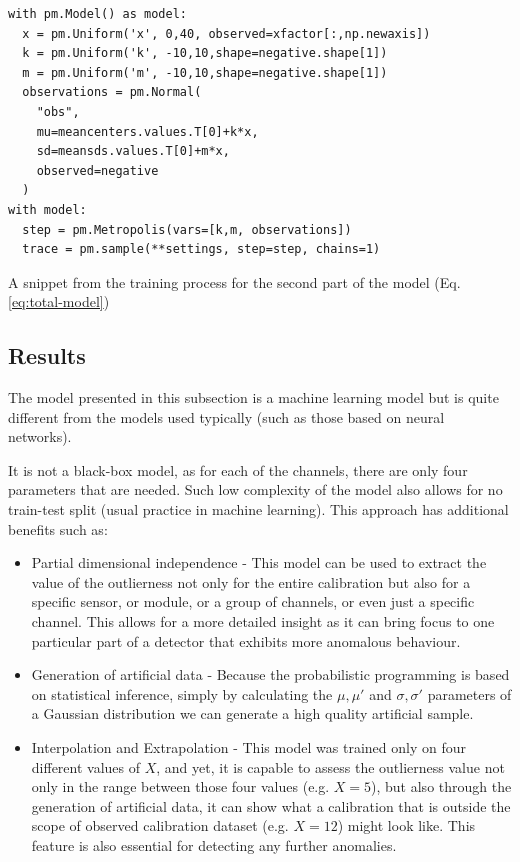 \begin{listing}[!ht]
\begin{verbatim}
with pm.Model() as model:
  x = pm.Uniform('x', 0,40, observed=xfactor[:,np.newaxis])
  k = pm.Uniform('k', -10,10,shape=negative.shape[1])
  m = pm.Uniform('m', -10,10,shape=negative.shape[1])
  observations = pm.Normal(
    "obs",
    mu=meancenters.values.T[0]+k*x,
    sd=meansds.values.T[0]+m*x,
    observed=negative
  )
with model:
  step = pm.Metropolis(vars=[k,m, observations])
  trace = pm.sample(**settings, step=step, chains=1)
\end{verbatim}
\caption{A snippet from the training process for the second part of the model (Eq. \ref{eq:total-model})}
\label{listing:calina2}
\end{listing}

\subsection{Results}

The model presented in this subsection is a machine learning model but is quite different from the models used typically (such as those based on neural networks).

It is not a black-box model, as for each of the channels, there are only four parameters that are needed. Such low complexity of the model also allows for no train-test split (usual practice in machine learning).
This approach has additional benefits such as:

\begin{itemize}
  \item Partial dimensional independence - This model can be used to extract the value of the outlierness not only for the entire calibration but also for a specific sensor, or module, or a group of channels, or even just a specific channel. This allows for a more detailed insight as it can bring focus to one particular part of a detector that exhibits more anomalous behaviour.
  \item Generation of artificial data - Because the probabilistic programming is based on statistical inference, simply by calculating the $\mu, \mu\prime$ and $\sigma, \sigma\prime$ parameters of a Gaussian distribution we can generate a high quality artificial sample.
  \item Interpolation and Extrapolation - This model was trained only on four different values of $X$, and yet, it is capable to assess the outlierness value not only in the range between those four values (e.g. $X=5$), but also through the generation of artificial data, it can show what a calibration that is outside the scope of observed calibration dataset (e.g. $X=12$) might look like. This feature is also essential for detecting any further anomalies.
\end{itemize}


